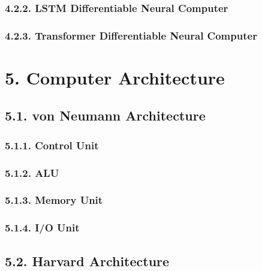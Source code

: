 \documentclass[
]{article}
\begin{document}
\hypertarget{lstm-differentiable-neural-computer}{%
\subsubsection{4.2.2. LSTM Differentiable Neural
Computer}\label{lstm-differentiable-neural-computer}}

\hypertarget{transformer-differentiable-neural-computer}{%
\subsubsection{4.2.3. Transformer Differentiable Neural
Computer}\label{transformer-differentiable-neural-computer}}

\hypertarget{computer-architecture}{%
\section{5. Computer Architecture}\label{computer-architecture}}

\hypertarget{von-neumann-architecture}{%
\subsection{5.1. von Neumann
Architecture}\label{von-neumann-architecture}}

\hypertarget{control-unit}{%
\subsubsection{5.1.1. Control Unit}\label{control-unit}}

\hypertarget{alu}{%
\subsubsection{5.1.2. ALU}\label{alu}}

\hypertarget{memory-unit}{%
\subsubsection{5.1.3. Memory Unit}\label{memory-unit}}

\hypertarget{io-unit}{%
\subsubsection{5.1.4. I/O Unit}\label{io-unit}}

\hypertarget{harvard-architecture}{%
\subsection{5.2. Harvard Architecture}\label{harvard-architecture}}
\end{document}
